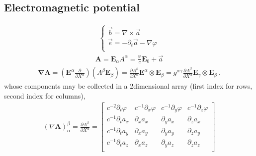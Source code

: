 \documentclass[letterpaper,10pt,english]{jupyterBook}
\begin{document}
\subsection{Electromagnetic potential}
\label{\detokenize{ch/relativity-special/notes:electromagnetic-potential}}\begin{equation*}
\begin{split}\begin{cases}
 \vec{b} = \nabla \times \vec{a} \\
 \vec{e} = -\partial_t \vec{a} - \nabla \varphi \\
\end{cases}\end{split}
\end{equation*}\begin{equation*}
\begin{split}\mathbf{A} = \mathbf{E}_{\alpha} A^{\alpha} = \frac{\varphi}{c} \mathbf{E}_0 + \vec{a}\end{split}
\end{equation*}\begin{equation*}
\begin{split}\symbf{\nabla} \mathbf{A} =
\left( \mathbf{E}^{\alpha} \frac{\partial}{\partial X^{\alpha}} \right) \left( A^{\beta} \mathbf{E}_{\beta} \right)
= \frac{\partial A^{\beta}}{\partial X^{\alpha}} \mathbf{E}^{\alpha} \otimes \mathbf{E}_{\beta} 
= g^{\alpha \gamma} \frac{\partial A^{\beta}}{\partial X^{\alpha}} \mathbf{E}_{\gamma} \otimes \mathbf{E}_{\beta}  \ .\end{split}
\end{equation*}
\sphinxAtStartPar
whose components may be collected in a 2\sphinxhyphen{}dimensional array (first index for rows, second index for columns),
\begin{equation*}
\begin{split}(\nabla \mathbf{A})_{\alpha}^{\beta} = \frac{\partial A^{\beta}}{\partial X^{\alpha}} =
\begin{bmatrix}
 c^{-2} \partial_t \varphi & c^{-1}\partial_x \varphi & c^{-1}\partial_y \varphi & c^{-1}\partial_z \varphi \\
 c^{-1} \partial_t a_x     &       \partial_x a_x     &       \partial_y a_x     &       \partial_z a_x     \\
 c^{-1} \partial_t a_y     &       \partial_x a_y     &       \partial_y a_y     &       \partial_z a_y     \\
 c^{-1} \partial_t a_z     &       \partial_x a_z     &       \partial_y a_z     &       \partial_z a_z     \\
\end{bmatrix}\end{split}
\end{equation*}
\end{document}
